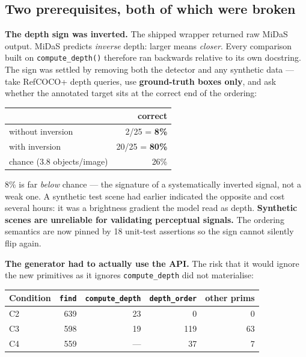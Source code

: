 \documentclass[11pt,a4paper]{article}
\newcommand{\up}[1]{\textcolor{good}{\textbf{#1}}}
\newcommand{\down}[1]{\textcolor{bad}{\textbf{#1}}}
\begin{document}
\subsection{Two prerequisites, both of which were broken}

\textbf{The depth sign was inverted.} The shipped wrapper returned raw MiDaS output.
MiDaS predicts \emph{inverse} depth: larger means \emph{closer}. Every comparison
built on \texttt{compute\_depth()} therefore ran backwards relative to its own
docstring. The sign was settled by removing both the detector and any synthetic data
--- take RefCOCO+ depth queries, use \textbf{ground-truth boxes only}, and ask
whether the annotated target sits at the correct end of the ordering:

\begin{center}\small
\begin{tabular}{@{}lr@{}}
\toprule
 & \textbf{correct} \\
\midrule
without inversion & 2/25 = \down{8\%} \\
with inversion & 20/25 = \up{80\%} \\
chance (3.8 objects/image) & 26\% \\
\bottomrule
\end{tabular}
\end{center}

\vspace{3pt}
8\% is far \emph{below} chance --- the signature of a systematically inverted signal,
not a weak one. A synthetic test scene had earlier indicated the opposite and cost
several hours: it was a brightness gradient the model read as depth. \textbf{Synthetic
scenes are unreliable for validating perceptual signals.} The ordering semantics are
now pinned by 18 unit-test assertions so the sign cannot silently flip again.

\textbf{The generator had to actually use the API.} The risk that it would ignore the
new primitives as it ignores \texttt{compute\_depth} did not materialise:

\begin{center}\small
\begin{tabular}{@{}lrrrr@{}}
\toprule
\textbf{Condition} & \texttt{find} & \texttt{compute\_depth} & \texttt{depth\_order} & \textbf{other prims} \\
\midrule
C2 & 639 & 23 & 0 & 0 \\
C3 & 598 & 19 & 119 & 63 \\
C4 & 559 & --- & 37 & 7 \\
\bottomrule
\end{tabular}
\end{center}
\end{document}
